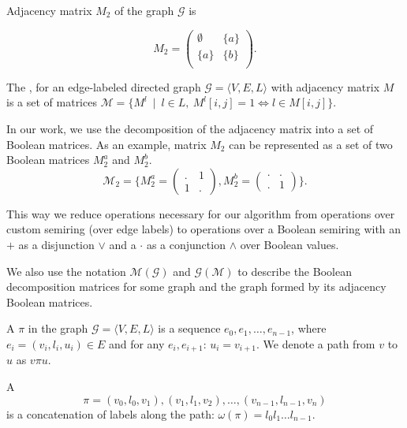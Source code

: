 Adjacency matrix $M_2$ of the graph $\mathcal{G}$ is

$$
    M_2 =
    \begin{pmatrix}
    \emptyset & \{a\}     \\
   \{a\}   &   \{b\}     \\
    \end{pmatrix}.
$$

\begin{definition}
The ,
for an edge-labeled directed graph $\mathcal{G} =
\langle V,E,L \rangle$ with adjacency matrix $M$ is a set of matrices $\mathcal{M} = \{ M^l~\mid~l \in L, \ M^l[i,j] = 1 \iff l \in M[i,j]\}$.
\end{definition}

In our work, we use the decomposition of the adjacency matrix into a set of Boolean matrices. As an example, matrix $M_2$ can be represented as a set of two Boolean matrices $M_2^a$ and $M_2^b$.
$$
\mathcal{M}_2 =\bigg\{
M_2^{a} =
\begin{pmatrix}
    . & 1     \\
    1 & .
\end{pmatrix},
M_2^{b} =
\begin{pmatrix}
    . & .    \\
    . & 1
\end{pmatrix}
\bigg\}.
$$

This way we reduce operations necessary for our algorithm from
operations over custom semiring (over edge labels) to operations over a Boolean semiring with an  $+$ as a disjunction $\lor$ and a  $\cdot$ as a conjunction $\land$ over Boolean values.

We also use the notation $\mathcal{M}(\mathcal{G})$ and $\mathcal{G}(\mathcal{M})$ to describe the Boolean decomposition matrices for some graph and the graph formed by its adjacency Boolean matrices.

\begin{definition}
A  $\pi$ in the graph $\mathcal{G} = \langle V,E,L \rangle$ is a sequence $e_0,e_1,\ldots,e_{n-1}$, where $e_i = (v_i,l_i,u_i) \in E$ and for any $e_i, e_{i+1}$: $u_i = v_{i+1}$. We denote a path from $v$ to $u$ as $v\pi u$.
\end{definition}

\begin{definition}
A  $$\pi = (v_0,l_0,v_1),(v_1,l_1,v_2),\ldots,(v_{n-1},l_{n-1},v_n)$$ is a concatenation of labels along the path: $\omega(\pi) = l_0 l_1 \ldots l_{n-1}$.
\end{definition}


